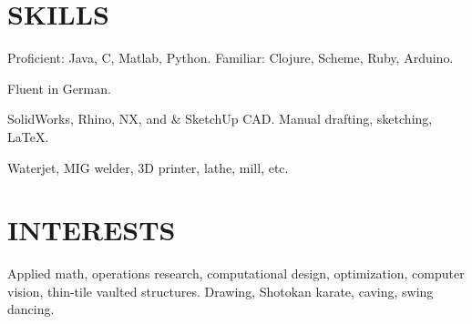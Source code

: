 \documentclass[margin]{res}
\begin{document}
\begin{resume}
\section{SKILLS} 
\begin{description} \itemsep -2pt
    \item[Programming:] Proficient: Java, C, Matlab, Python. Familiar: Clojure, Scheme, Ruby, Arduino.
    \item[Linguistic:] Fluent in German.
    \item[Design:] SolidWorks, Rhino, NX, and \& SketchUp CAD. Manual drafting, sketching, \LaTeX.
    \item[Machine Shop:] Waterjet, MIG welder, 3D printer, lathe, mill, etc.
\end{description}


\section{INTERESTS}
Applied math, operations research, computational design, optimization, computer vision, thin-tile vaulted structures. Drawing, Shotokan karate, caving, swing dancing.
\end{resume}
\end{document}
